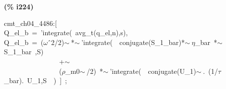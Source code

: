 \documentclass[fleqn]{article}
\begin{document}
\noindent
\begin{minipage}[t]{4.000000em}\color{red}\bfseries
(\% i224)	
\end{minipage}
\begin{minipage}[t]{\textwidth}\color{blue}
cmt\_ch04\_4486:[\\
Q\_el\_b\ =\ 'integrate(\ avg\_t(q\_el,n),s),\\
Q\_el\_b\ =\ (\ensuremath{\omega}\^\ 2/2)\ensuremath{\sim\ }*\ensuremath{\sim\ }'integrate(\ \ conjugate(S\_1\_bar)*\ensuremath{\sim\ }\ensuremath{\eta}\_bar\ *\ensuremath{\sim\ }S\_1\_bar\ ,S)\ \ \ \\
\ \ \ \ \ \ \ \ \ \ \ \ \ \ \ \ +\ensuremath{\sim\ }\\
\ \ \ \ \ \ \ \ \ \ \ \ \ \ \ \ (\ensuremath{\rho}\_m0\ensuremath{\sim\ }/2)\ *\ensuremath{\sim\ }'integrate(\ \ conjugate(U\_1)\ensuremath{\sim\ }.\ (1/\ensuremath{\tau}\_bar).\ U\_1,S\ \ )\ ]\ ;
\end{minipage}
\end{document}
